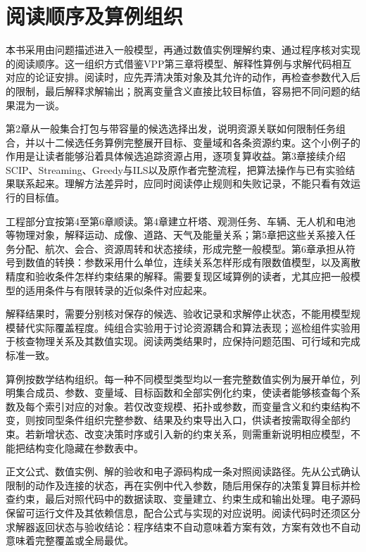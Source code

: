 \section{阅读顺序及算例组织}
\label{sec:01_05}

本书采用由问题描述进入一般模型，再通过数值实例理解约束、通过程序核对实现的阅读顺序。这一组织方式借鉴VPP第三章将模型、解释性算例与求解代码相互对应的论证安排\cite{VPP2020}。阅读时，应先弄清决策对象及其允许的动作，再检查参数代入后的限制，最后解释求解输出；脱离变量含义直接比较目标值，容易把不同问题的结果混为一谈。

第2章从一般集合打包与带容量的候选选择出发，说明资源关联如何限制任务组合，并以十二候选任务算例完整展开目标、变量域和各条资源约束。这个小例子的作用是让读者能够沿着具体候选追踪资源占用，逐项复算收益。第3章接续介绍SCIP、Streaming、Greedy与ILS以及原作者完整流程，把算法操作与已有实验结果联系起来。理解方法差异时，应同时阅读停止规则和失败记录，不能只看有效运行的目标值。

工程部分宜按第4至第6章顺读。第4章建立杆塔、观测任务、车辆、无人机和电池等物理对象，解释运动、成像、道路、天气及能量关系；第5章把这些关系接入任务分配、航次、会合、资源周转和状态接续，形成完整一般模型。第6章承担从符号到数值的转换：参数采用什么单位，连续关系怎样形成有限数值模型，以及离散精度和验收条件怎样约束结果的解释。需要复现区域算例的读者，尤其应把一般模型的适用条件与有限转录的近似条件对应起来。

解释结果时，需要分别核对保存的候选、验收记录和求解停止状态，不能用模型规模替代实际覆盖程度。纯组合实验用于讨论资源耦合和算法表现；巡检组件实验用于核查物理关系及其数值实现。阅读两类结果时，应保持问题范围、可行域和完成标准一致。

算例按数学结构组织。每一种不同模型类型均以一套完整数值实例为展开单位，列明集合成员、参数、变量域、目标函数和全部实例化约束，使读者能够核查每个系数及每个索引对应的对象。若仅改变规模、拓扑或参数，而变量含义和约束结构不变，则按同型条件组织完整参数、结果及约束导出入口，供读者按需取得全部约束。若新增状态、改变决策时序或引入新的约束关系，则需重新说明相应模型，不能把结构变化隐藏在参数表中。

正文公式、数值实例、解的验收和电子源码构成一条对照阅读路径。先从公式确认限制的动作及连接的状态，再在实例中代入参数，随后用保存的决策复算目标并检查约束，最后对照代码中的数据读取、变量建立、约束生成和输出处理。电子源码保留可运行文件及其依赖信息，配合公式与实现的对应说明。阅读代码时还须区分求解器返回状态与验收结论：程序结束不自动意味着方案有效，方案有效也不自动意味着完整覆盖或全局最优。
